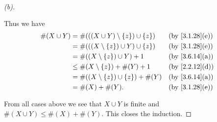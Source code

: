 \begin{proof}[(b)]
\begin{itemize}
		      Thus we have
		      \begin{align*}
			      \#(X \cup Y) & = \#(((X \cup Y) \setminus \set{z}) \cup \set{z}) &  & \by{3.1.28}[e] \\
			                   & = \#(((X \setminus \set{z}) \cup Y) \cup \set{z}) &  & \by{3.1.28}[e] \\
			                   & = \#((X \setminus \set{z}) \cup Y) + 1            &  & \by{3.6.14}[a] \\
			                   & \leq \#(X \setminus \set{z}) + \#(Y) + 1          &  & \by{2.2.12}[d] \\
			                   & = \#((X \setminus \set{z}) \cup \set{z}) + \#(Y)  &  & \by{3.6.14}[a] \\
			                   & = \#(X) + \#(Y).                                  &  & \by{3.1.28}[e]
		      \end{align*}
	\end{itemize}
	From all cases above we see that \(X \cup Y\) is finite and \(\#(X \cup Y) \leq \#(X) + \#(Y)\).
	This closes the induction.


\end{proof}

